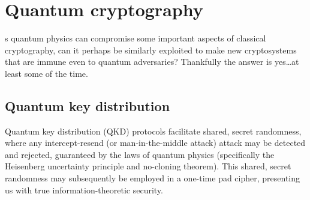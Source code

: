 %
%

\section{Quantum cryptography}

s quantum physics can compromise some important aspects of classical cryptography, can it perhaps be similarly exploited to make new cryptosystems that are immune even to quantum adversaries? Thankfully the answer is yes\ldots at least some of the time.

%
%

\subsection{Quantum key distribution} \label{sec:QKD} 



Quantum key distribution (QKD) protocols facilitate shared, secret randomness, where any intercept-resend (or man-in-the-middle attack) attack may be detected and rejected, guaranteed by the laws of quantum physics (specifically the Heisenberg uncertainty principle and no-cloning theorem). This shared, secret randomness may subsequently be employed in a one-time pad cipher, presenting us with true information-theoretic security.

